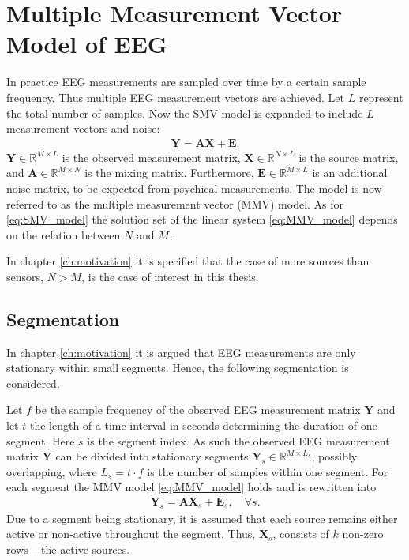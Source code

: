 \section{Multiple Measurement Vector Model of EEG}\label{sec:MMV}
In practice EEG measurements are sampled over time by a certain sample frequency. 
Thus multiple EEG measurement vectors are achieved.
Let $L$ represent the total number of samples. 
Now the SMV model is expanded to include $L$ measurement vectors and noise:
\begin{align}\label{eq:MMV_model}
\mathbf{Y} = \mathbf{AX}+\textbf{E}.
\end{align}
$\mathbf{Y} \in \mathbb{R}^{M \times L}$ is the observed measurement matrix, $\mathbf{X} \in \mathbb{R}^{N \times L}$ is the source matrix, and $\mathbf{A} \in \mathbb{R}^{M \times N}$ is the mixing matrix. 
Furthermore, $\mathbf{E} \in \mathbb{R}^{M \times L}$ is an additional noise matrix, to be expected from psychical measurements.  
The model is now referred to as the multiple measurement vector (MMV) model.
As for \eqref{eq:SMV_model} the solution set of the linear system \eqref{eq:MMV_model} depends on the relation between $N$ and $M$ \cite[p. 42]{CS}. 

In chapter \ref{ch:motivation} it is specified that the case of more sources than sensors, $N>M$, is the case of interest in this thesis.  

\subsection{Segmentation}\label{seg_segmentation}
In chapter \ref{ch:motivation} it is argued that EEG measurements are only stationary within small segments. 
Hence, the following segmentation is considered.

Let $f$ be the sample frequency of the observed EEG measurement matrix $\mathbf{Y}$ and let $t$ the length of a time interval in seconds determining the duration of one segment. 
Here $s$ is the segment index. 
As such the observed EEG measurement matrix $\mathbf{Y}$ can be divided into stationary segments $\mathbf{Y}_s \in \mathbb{R}^{M \times L_{s}}$, possibly overlapping, where $L_s = t \cdot f$ is the number of samples within one segment. 
For each segment the MMV model \eqref{eq:MMV_model} holds and is rewritten into 
\begin{align}\label{eq:MMV_seg}
\mathbf{Y}_s = \mathbf{AX}_s + \textbf{E}_s, \quad \forall s.
\end{align}
Due to a segment being stationary, it is assumed that each source remains either active or non-active throughout the segment.
Thus, $\mathbf{X}_s$, consists of $k$ non-zero rows -- the active sources.

